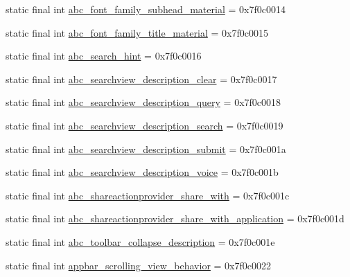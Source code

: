 \begin{DoxyCompactItemize}
\item 
static final int \mbox{\hyperlink{classandroid_1_1support_1_1design_1_1R_1_1string_aeab04c3458d19988f42b071928374749}{abc\+\_\+font\+\_\+family\+\_\+subhead\+\_\+material}} = 0x7f0c0014
\item 
static final int \mbox{\hyperlink{classandroid_1_1support_1_1design_1_1R_1_1string_ae1a3235a15930a23d4e8915dba083812}{abc\+\_\+font\+\_\+family\+\_\+title\+\_\+material}} = 0x7f0c0015
\item 
static final int \mbox{\hyperlink{classandroid_1_1support_1_1design_1_1R_1_1string_a49cacb037d06f1b5b99ad9093a9a78e5}{abc\+\_\+search\+\_\+hint}} = 0x7f0c0016
\item 
static final int \mbox{\hyperlink{classandroid_1_1support_1_1design_1_1R_1_1string_ada43ec0fa6465dcc33878e45bd9d0fdf}{abc\+\_\+searchview\+\_\+description\+\_\+clear}} = 0x7f0c0017
\item 
static final int \mbox{\hyperlink{classandroid_1_1support_1_1design_1_1R_1_1string_a02e8b7161ffa91e25f2f8623cec6b2cf}{abc\+\_\+searchview\+\_\+description\+\_\+query}} = 0x7f0c0018
\item 
static final int \mbox{\hyperlink{classandroid_1_1support_1_1design_1_1R_1_1string_a6bf26a757b0d4c764952cc3795158341}{abc\+\_\+searchview\+\_\+description\+\_\+search}} = 0x7f0c0019
\item 
static final int \mbox{\hyperlink{classandroid_1_1support_1_1design_1_1R_1_1string_a86402c10a07ce0ef57379f1e52663aeb}{abc\+\_\+searchview\+\_\+description\+\_\+submit}} = 0x7f0c001a
\item 
static final int \mbox{\hyperlink{classandroid_1_1support_1_1design_1_1R_1_1string_a04a007dba1181292400d15625e31353a}{abc\+\_\+searchview\+\_\+description\+\_\+voice}} = 0x7f0c001b
\item 
static final int \mbox{\hyperlink{classandroid_1_1support_1_1design_1_1R_1_1string_a77ff2da70667bbe5ae57ebdbdc2738ea}{abc\+\_\+shareactionprovider\+\_\+share\+\_\+with}} = 0x7f0c001c
\item 
static final int \mbox{\hyperlink{classandroid_1_1support_1_1design_1_1R_1_1string_abe49db143c1d58a411f52de9775ac1f8}{abc\+\_\+shareactionprovider\+\_\+share\+\_\+with\+\_\+application}} = 0x7f0c001d
\item 
static final int \mbox{\hyperlink{classandroid_1_1support_1_1design_1_1R_1_1string_a1eb7e00e0658289be2b77468cd353b75}{abc\+\_\+toolbar\+\_\+collapse\+\_\+description}} = 0x7f0c001e
\item 
static final int \mbox{\hyperlink{classandroid_1_1support_1_1design_1_1R_1_1string_a87a9e93b543f76960b86c5e59fd5a9d0}{appbar\+\_\+scrolling\+\_\+view\+\_\+behavior}} = 0x7f0c0022

\end{DoxyCompactItemize}
